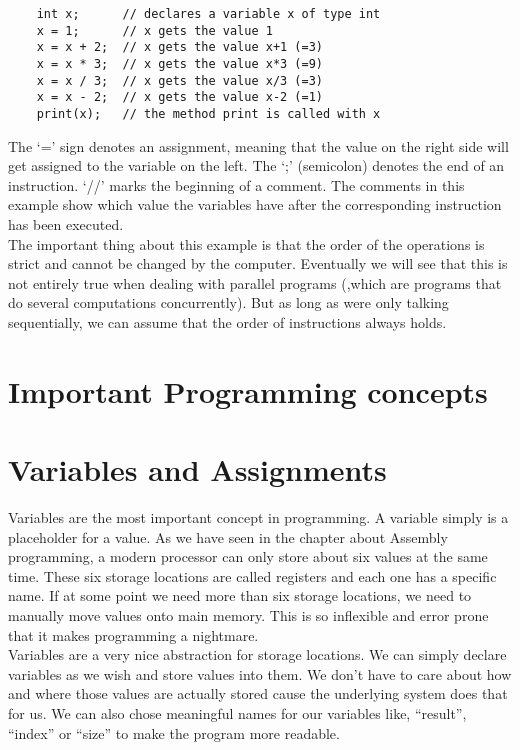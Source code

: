 \documentclass{scrreprt}
\begin{document}
\lstset{language=C}
\begin{lstlisting}
	int x;		// declares a variable x of type int
	x = 1;		// x gets the value 1
	x = x + 2;	// x gets the value x+1 (=3)
	x = x * 3;	// x gets the value x*3 (=9)
	x = x / 3;	// x gets the value x/3 (=3)
	x = x - 2;	// x gets the value x-2 (=1)
	print(x);	// the method print is called with x
\end{lstlisting}
The `=' sign denotes an assignment, meaning that the value on the right side will get assigned to the variable on the left. The `;' (semicolon) denotes the end of an instruction. `//' marks the beginning of a comment. The comments in this example show which value the variables have after the corresponding instruction has been executed. \\

The important thing about this example is that the order of the operations is strict and cannot be changed by the computer. Eventually we will see that this is not entirely true when dealing with parallel programs (,which are programs that do several computations concurrently). But as long as were only talking sequentially, we can assume that the order of instructions always holds. \\

\section{Important Programming concepts}
\section{Variables and Assignments}
Variables are the most important concept in programming. A variable simply is a placeholder for a value. As we have seen in the chapter about Assembly programming, a modern processor can only store about six values at the same time. These six storage locations are called registers and each one has a specific name. If at some point we need more than six storage locations, we need to manually move values onto main memory. This is so inflexible and error prone that it makes programming a nightmare. \\
Variables are a very nice abstraction for storage locations. We can simply declare variables as we wish and store values into them. We don't have to care about how and where those values are actually stored cause the underlying system does that for us. We can also chose meaningful names for our variables like, ``result'', ``index'' or ``size'' to make the program more readable. \\
\end{document}
